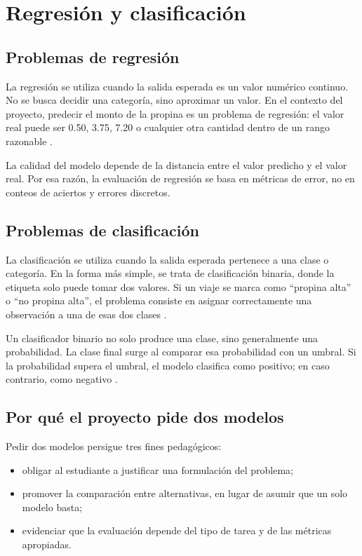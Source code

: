 \documentclass[12pt]{article}
\begin{document}
\section{Regresión y clasificación}
\subsection{Problemas de regresión}
La regresión se utiliza cuando la salida esperada es un valor numérico continuo. No se busca decidir una categoría, sino aproximar un valor. En el contexto del proyecto, predecir el monto de la propina es un problema de regresión: el valor real puede ser 0.50, 3.75, 7.20 o cualquier otra cantidad dentro de un rango razonable \cite{google_linear_loss}.

La calidad del modelo depende de la distancia entre el valor predicho y el valor real. Por esa razón, la evaluación de regresión se basa en métricas de error, no en conteos de aciertos y errores discretos.

\subsection{Problemas de clasificación}
La clasificación se utiliza cuando la salida esperada pertenece a una clase o categoría. En la forma más simple, se trata de clasificación binaria, donde la etiqueta solo puede tomar dos valores. Si un viaje se marca como ``propina alta'' o ``no propina alta'', el problema consiste en asignar correctamente una observación a una de esas dos clases \cite{gcp_create_glm,google_class_metrics}.

Un clasificador binario no solo produce una clase, sino generalmente una probabilidad. La clase final surge al comparar esa probabilidad con un umbral. Si la probabilidad supera el umbral, el modelo clasifica como positivo; en caso contrario, como negativo \cite{google_thresholding}.

\subsection{Por qué el proyecto pide dos modelos}
Pedir dos modelos persigue tres fines pedagógicos:
\begin{itemize}[leftmargin=*]
\item obligar al estudiante a justificar una formulación del problema;
\item promover la comparación entre alternativas, en lugar de asumir que un solo modelo basta;
\item evidenciar que la evaluación depende del tipo de tarea y de las métricas apropiadas.
\end{itemize}
\end{document}
